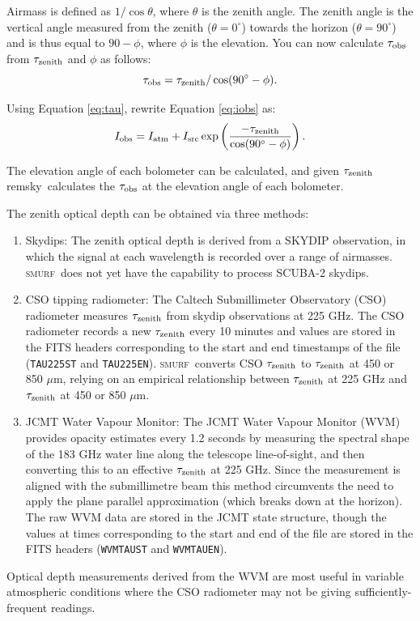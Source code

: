 \documentclass[twoside,11pt]{article}
\newcommand{\xref}[3]{#1}
\renewcommand{\_}{\texttt{\symbol{95}}}
\newcommand{\SMURF}{\textsc{smurf}}
\newcommand{\task}[1]{\textsf{#1}}
\newcommand{\remsky}{\xref{\task{remsky}}{sun258}{REMSKY}}
\begin{document}
Airmass is defined as $1 / \cos \theta$, where $\theta$ is the zenith
angle. The zenith angle is the vertical angle measured from the zenith
($\theta = 0^\circ$) towards the horizon ($\theta = 90^\circ$) and is
thus equal to $90-\phi$, where $\phi$ is the elevation. You can now
calculate $\tau_{\rm obs}$ from $\tau_{\rm zenith}$ and $\phi$ as
follows:
\begin{equation}
\tau_{\rm obs} = \tau_{\rm zenith} / \cos(90^\circ - \phi ).
\label{eq:tau}
\end{equation}

Using Equation \ref{eq:tau}, rewrite Equation \ref{eq:iobs} as:
\begin{equation}
I_{\rm obs} = I_{\rm atm} + I_{\rm src} \exp \left(
\frac{-\tau_{\rm zenith}}{\cos(90^\circ-\phi)}\right).
\end{equation}

The elevation angle of each bolometer can be calculated, and given
$\tau_{\rm zenith}$ \remsky\ calculates the $\tau_{\rm obs}$ at the
elevation angle of each bolometer.

The zenith optical depth can be obtained via three methods:
\begin{enumerate}
\item Skydips: The zenith optical depth is derived from a SKYDIP
  observation, in which the signal at each wavelength is recorded over
  a range of airmasses. \SMURF\ does not yet have the capability to
  process SCUBA-2 skydips.

\item CSO tipping radiometer: The Caltech Submillimeter Observatory
  (CSO) radiometer measures $\tau_{\rm zenith}$ from skydip
  observations at 225 GHz. The CSO radiometer records a new $\tau_{\rm
    zenith}$ every 10 minutes and values are stored in the FITS
  headers corresponding to the start and end timestamps of the file
  (\texttt{TAU225ST} and \texttt{TAU225EN}). \SMURF\ converts CSO
  $\tau_{\rm zenith}$ to $\tau_{\rm zenith}$ at 450 or 850 $\mu$m,
  relying on an empirical relationship between $\tau_{\rm zenith}$ at
  225 GHz and $\tau_{\rm zenith}$ at 450 or 850 $\mu$m.

\item JCMT Water Vapour Monitor: The JCMT Water Vapour Monitor (WVM)
  provides opacity estimates every 1.2 seconds by measuring the
  spectral shape of the 183 GHz water line along the telescope
  line-of-sight, and then converting this to an effective $\tau_{\rm
    zenith}$ at 225 GHz. Since the measurement is aligned with the
  submillimetre beam this method circumvents the need to apply the
  plane parallel approximation (which breaks down at the horizon). The
  raw WVM data are stored in the JCMT state structure, though the
  values at times corresponding to the start and end of the file are
  stored in the FITS headers (\texttt{WVMTAUST} and
  \texttt{WVMTAUEN}).
\end{enumerate}
Optical depth measurements derived from the WVM are most useful in
variable atmospheric conditions where the CSO radiometer may not be
giving sufficiently-frequent readings.
\end{document}
